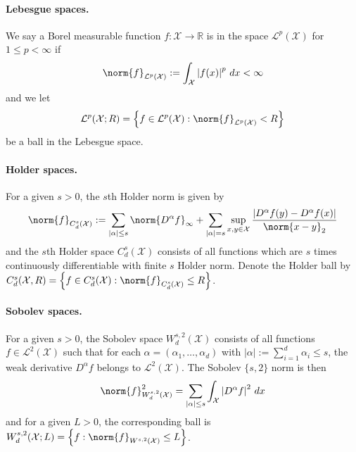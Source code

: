 \documentclass{article}
\newcommand{\Reals}{\mathbb{R}}
\newcommand{\abs}[1]{\left \lvert #1 \right \rvert}
\newcommand{\set}[1]{\left\{#1\right\}}
\newcommand{\1}{\mathbf{1}}
\newcommand{\Xset}{\mathcal{X}}
\theoremstyle{alden}
\theoremstyle{aldenthm}
\theoremstyle{definition}
\theoremstyle{remark}
\begin{document}
\paragraph{Lebesgue spaces.}

We say a Borel measurable function $f: \mathcal{X} \to \Reals$ is in the space $\mathcal{L}^p(\mathcal{X})$ for $1 \leq p < \infty$ if 
$$\norm{f}_{\mathcal{L}^p(\mathcal{X})} := \int_{\mathcal{X}} \abs{f(x)}^p \,dx < \infty$$
and we let 
\begin{equation*}
\mathcal{L}^p(\mathcal{X};R) = \set{f \in \mathcal{L}^p(\mathcal{X}): \norm{f}_{\mathcal{L}^p(\mathcal{X})} < R}
\end{equation*}
be a ball in the Lebesgue space.


\paragraph{Holder spaces.}

For a given $s > 0$, the $s$th Holder norm is given by
\begin{equation*}
\norm{f}_{C_d^{s}(\mathcal{X})} := \sum_{\abs{\alpha} \leq s} \norm{D^{\alpha}f}_{\infty} + \sum_{\abs{\alpha} = s} \sup_{x,y \in \mathcal{X}} \frac{\abs{D^{\alpha}f(y) - D^{\alpha}f(x)}}{\norm{x - y}_2}
\end{equation*}
and the $s$th Holder space $C_d^{s}(\mathcal{X})$ consists of all functions which are $s$ times continuously differentiable with finite $s$ Holder norm. Denote the Holder  ball by $C_d^{s}(\mathcal{X},R) = \set{f \in C_d^{s}(\mathcal{X}): \norm{f}_{C_d^{s}(\mathcal{X})} \leq R}$.

\paragraph{Sobolev spaces.}

For a given $s > 0$, the Sobolev space $W_d^{s,2}(\mathcal{X})$ consists of all functions $f \in \mathcal{L}^2(\mathcal{X})$ such that for each $\alpha = (\alpha_1,\ldots,\alpha_d)$ with $\abs{\alpha} := \sum_{i = 1}^{d} \alpha_i \leq s$, the weak derivative $D^{\alpha}f$ belongs to $\mathcal{L}^2(\mathcal{X})$. The Sobolev $\{s,2\}$ norm is then 
\begin{equation*}
\norm{f}_{W_d^{s,2}(\mathcal{X})}^2 = \sum_{\abs{\alpha} \leq s} \int_{\mathcal{X}} \abs{D^{\alpha}f}^2 \,dx
\end{equation*}
and for a given $L > 0$, the corresponding ball is $W_d^{s,2}(\Xset; L) = \set{f: \norm{f}_{W^{s,2}(\Xset)} \leq L}$.
\end{document}
